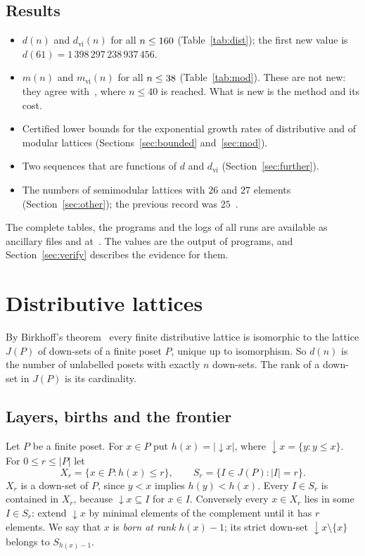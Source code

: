 \documentclass[11pt]{amsart}
\theoremstyle{definition}
\theoremstyle{remark}
\newcommand{\dn}{{\downarrow}}
\begin{document}
\subsection*{Results}
\begin{itemize}
\item $d(n)$ and $d_{\mathrm{vi}}(n)$ for all $n \le 160$ (Table~\ref{tab:dist});
  the first new value is\\ $d(61) = 1\,398\,297\,238\,937\,456$.
\item $m(n)$ and $m_{\mathrm{vi}}(n)$ for all $n \le 38$ (Table~\ref{tab:mod}).  These are
  not new: they agree with~\cite{Koh23}, where $n \le 40$ is reached.  What is new is the
  method and its cost.
\item Certified lower bounds for the exponential growth rates of distributive and of modular
  lattices (Sections~\ref{sec:bounded} and~\ref{sec:mod}).
\item Two sequences that are functions of $d$ and $d_{\mathrm{vi}}$ (Section~\ref{sec:further}).
\item The numbers of semimodular lattices with $26$ and $27$ elements
  (Section~\ref{sec:other}); the previous record was $25$~\cite{Koh19}.
\end{itemize}
The complete tables, the programs and the logs of all runs are available as
ancillary files and at~\cite{code}.  The values are the output of
programs, and Section~\ref{sec:verify} describes the evidence for them.

\section{Distributive lattices}\label{sec:dist}

By Birkhoff's theorem~\cite[Theorem~3.4.1]{Stanley} every finite distributive lattice
is isomorphic to the lattice $J(P)$ of down-sets of a finite poset $P$, unique up to
isomorphism.  So $d(n)$ is the number of unlabelled posets with exactly $n$ down-sets.
The rank of a down-set in $J(P)$ is its cardinality.

\subsection{Layers, births and the frontier}
Let $P$ be a finite poset.  For $x \in P$ put $h(x) = |\dn x|$, where
$\dn x = \{y : y \le x\}$.  For $0 \le r \le |P|$ let
\[
  X_r = \{x \in P : h(x) \le r\}, \qquad S_r = \{I \in J(P) : |I| = r\}.
\]
$X_r$ is a down-set of $P$, since $y < x$ implies $h(y) < h(x)$.  Every $I \in S_r$ is
contained in $X_r$, because $\dn x \subseteq I$ for $x \in I$.  Conversely every
$x \in X_r$ lies in some $I \in S_r$: extend $\dn x$ by minimal elements of the
complement until it has $r$ elements.  We say that $x$ is \emph{born at rank} $h(x)-1$;
its strict down-set $\dn x \setminus \{x\}$ belongs to $S_{h(x)-1}$.
\end{document}
